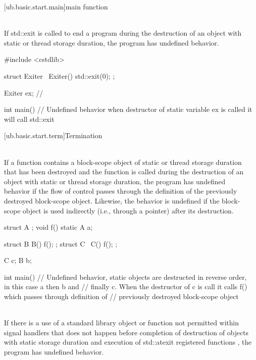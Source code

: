 [ub.basic.start.main]{main function}

\pnum
{} \\
If std::exit is called to
end a program during the destruction of an object with static or thread storage duration, the program has
undefined behavior.

\pnum
\begin{example}
\begin{codeblock}
#include <cstdlib>

struct Exiter {
  ~Exiter() { std::exit(0); }
};

Exiter ex;  //

int main() {}
// Undefined behavior when destructor of static variable ex is called it will call std::exit
\end{codeblock}
\end{example}


[ub.basic.start.term]{Termination}

\pnum
{} \\
If a function contains a block-scope object of static or thread storage duration that has been destroyed and the
function is called during the destruction of an object with static or thread storage duration, the program has
undefined behavior if the flow of control passes through the definition of the previously destroyed block-scope
object. Likewise, the behavior is undefined if the block-scope object is used indirectly (i.e., through a pointer)
after its destruction.

\pnum
\begin{example}
\begin{codeblock}
struct A {};
void f() {
  static A a;
}

struct B {
  B() { f(); }
};
struct C {
  ~C() { f(); }
};

C c;
B b;

int main() {}
// Undefined behavior, static objects are destructed in reverse order, in this case a then b and
// finally c. When the destructor of c is call it calls f() which passes through definition of
// previously destroyed block-scope object
\end{codeblock}
\end{example}


\pnum
{} \\
If there is a use of a standard library object or function not permitted within signal handlers  that
does not happen before  completion of destruction of objects with static storage duration and execution
of std::atexit registered functions , the program has undefined behavior.

